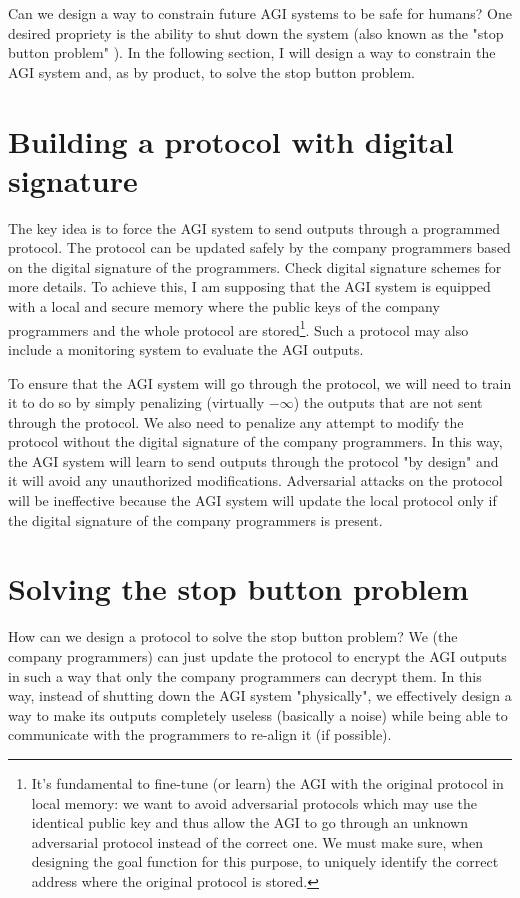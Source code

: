 \documentclass{article}
\begin{document}
Can we design a way to constrain future AGI systems to be safe for humans?
One desired propriety is the ability to shut down the system (also known as the "stop button problem" \cite{corrigibility}).
In the following section, I will design a way to constrain the AGI system and, as by product, to solve the stop button problem.

\section{Building a protocol with digital signature}
The key idea is to force the AGI system to send outputs through a programmed protocol.
The protocol can be updated safely by the company programmers based on the digital signature of the programmers. Check digital signature schemes \cite{digital_signature} for more details.
To achieve this, I am supposing that the AGI system is equipped with a local and secure memory where the public keys of the company programmers and the whole protocol are stored\footnote{It's fundamental to fine-tune (or learn) the AGI with the original protocol in local memory: we want to avoid adversarial protocols which may use the identical public key and thus allow the AGI to go through an unknown adversarial protocol instead of the correct one. We must make sure, when designing the goal function for this purpose, to uniquely identify the correct address where the original protocol is stored.}.
Such a protocol may also include a monitoring system to evaluate the AGI outputs.

To ensure that the AGI system will go through the protocol, we will need to train it to do so by simply penalizing (virtually $-\infty$) the outputs that are not sent through the protocol.
We also need to penalize any attempt to modify the protocol without the digital signature of the company programmers.
In this way, the AGI system will learn to send outputs through the protocol "by design" and it will avoid any unauthorized modifications.
Adversarial attacks on the protocol will be ineffective because the AGI system will update the local protocol only if the digital signature of the company programmers is present.

\section{Solving the stop button problem}
How can we design a protocol to solve the stop button problem?
We (the company programmers) can just update the protocol to encrypt the AGI outputs in such a way that only the company programmers can decrypt them.
In this way, instead of shutting down the AGI system "physically", we effectively design a way to make its outputs completely useless (basically a noise) 
while being able to communicate with the programmers to re-align it (if possible).
\end{document}
